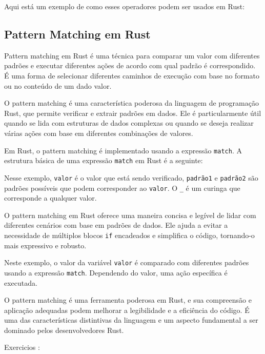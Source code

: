 \documentclass[12pt,a4paper,oneside]{abntex2}
\begin{document}
Aqui está um exemplo de como esses operadores podem ser usados em Rust:

%


\subsection{Pattern Matching em Rust}
Pattern matching em Rust é uma técnica para comparar um valor com diferentes padrões e executar diferentes ações de acordo com qual padrão é correspondido. É uma forma de selecionar diferentes caminhos de execução com base no formato ou no conteúdo de um dado valor.

O pattern matching é uma característica poderosa da linguagem de programação Rust, que permite verificar e extrair padrões em dados. Ele é particularmente útil quando se lida com estruturas de dados complexas ou quando se deseja realizar várias ações com base em diferentes combinações de valores.

Em Rust, o pattern matching é implementado usando a expressão \texttt{match}. A estrutura básica de uma expressão \texttt{match} em Rust é a seguinte:



Nesse exemplo, \texttt{valor} é o valor que está sendo verificado, \texttt{padrão1} e \texttt{padrão2} são padrões possíveis que podem corresponder ao \texttt{valor}. O \texttt{\_} é um curinga que corresponde a qualquer valor.

O pattern matching em Rust oferece uma maneira concisa e legível de lidar com diferentes cenários com base em padrões de dados. Ele ajuda a evitar a necessidade de múltiplos blocos \texttt{if} encadeados e simplifica o código, tornando-o mais expressivo e robusto.

%


Neste exemplo, o valor da variável \texttt{valor} é comparado com diferentes padrões usando a expressão \texttt{match}. Dependendo do valor, uma ação específica é executada.

O pattern matching é uma ferramenta poderosa em Rust, e sua compreensão e aplicação adequadas podem melhorar a legibilidade e a eficiência do código. É uma das características distintivas da linguagem e um aspecto fundamental a ser dominado pelos desenvolvedores Rust.

Exercicios :
\end{document}
